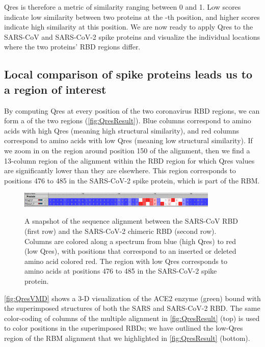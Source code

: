 Qres is therefore a metric of similarity ranging between 0 and 1. Low scores indicate low similarity between two proteins at the -th position, and higher scores indicate high similarity at this position. We are now ready to apply Qres to the SARS-CoV and SARS-CoV-2 spike proteins and visualize the individual locations where the two proteins' RBD regions differ.

\FloatBarrier
{}
\subsection{Local comparison of spike proteins leads us to a region of interest}

By computing Qres at every position of the two coronavirus RBD regions, we can form a  of the two regions (\autoref{fig:QresResult}). Blue columns correspond to amino acids with high Qres (meaning high structural similarity), and red columns correspond to amino acids with low Qres (meaning low structural similarity). If we zoom in on the region around position 150 of the alignment, then we find a 13-column region of the alignment within the RBD region for which Qres values are significantly lower than they are elsewhere. This region corresponds to positions 476 to 485 in the SARS-CoV-2 spike protein, which is part of the RBM.\\

\begin{figure}[h]
	\centering
	\mySfFamily
		\includegraphics[width = 0.85\textwidth]{../images/QresResult.png} \\
	\caption{A snapshot of the sequence alignment between the SARS-CoV RBD (first row) and the SARS-CoV-2 chimeric RBD (second row). Columns are colored along a spectrum from blue (high Qres) to red (low Qres), with positions that correspond to an inserted or deleted amino acid colored red. The region with low Qres corresponds to amino acids at positions 476 to 485 in the SARS-CoV-2 spike protein.}
	\label{fig:QresResult}
\end{figure}

\autoref{fig:QresVMD} shows a 3-D visualization of the ACE2 enzyme (green) bound with the superimposed structures of both the SARS and SARS-CoV-2 RBD. The same color-coding of columns of the multiple alignment in \autoref{fig:QresResult} (top) is used to color positions in the superimposed RBDs; we have outlined the low-Qres region of the RBM alignment that we highlighted in \autoref{fig:QresResult} (bottom).\\

